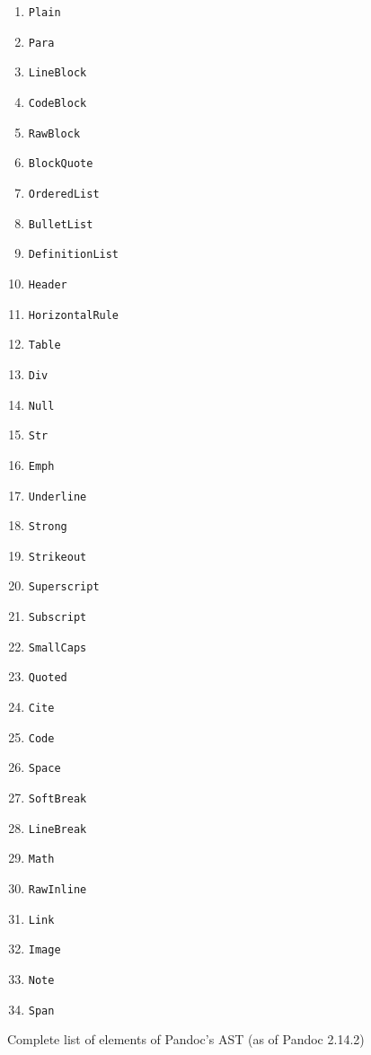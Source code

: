 \documentclass[
  digital,     %
  oneside,     %
  nosansbold,  %
  nocolorbold, %
  lof,         %
  lot,         %
]{fithesis4}
\begin{document}

\begin{figure}
  \centering
  \begin{multicols}{3}
    \begin{enumerate}
      \item \texttt{Plain}
      \item \texttt{Para}
      \item \texttt{LineBlock}
      \item \texttt{CodeBlock}
      \item \texttt{RawBlock}
      \item \texttt{BlockQuote}
      \item \texttt{OrderedList}
      \item \texttt{BulletList}
      \item \texttt{DefinitionList}
      \item \texttt{Header}
      \item \texttt{HorizontalRule}
      \item \texttt{Table}
      \item \texttt{Div}
      \item \texttt{Null}
      \item \texttt{Str}
      \item \texttt{Emph}
      \item \texttt{Underline}
      \item \texttt{Strong}
      \item \texttt{Strikeout}
      \item \texttt{Superscript}
      \item \texttt{Subscript}
      \item \texttt{SmallCaps}
      \item \texttt{Quoted}
      \item \texttt{Cite}
      \item \texttt{Code}
      \item \texttt{Space}
      \item \texttt{SoftBreak}
      \item \texttt{LineBreak}
      \item \texttt{Math}
      \item \texttt{RawInline}
      \item \texttt{Link}
      \item \texttt{Image}
      \item \texttt{Note}
      \item \texttt{Span}
    \end{enumerate}
  \end{multicols}
  \vspace*{-1em}
  \caption{Complete list of elements of Pandoc's AST (as of Pandoc 2.14.2)}
  \label{fig:pandoc-elems}
\end{figure}
\end{document}

